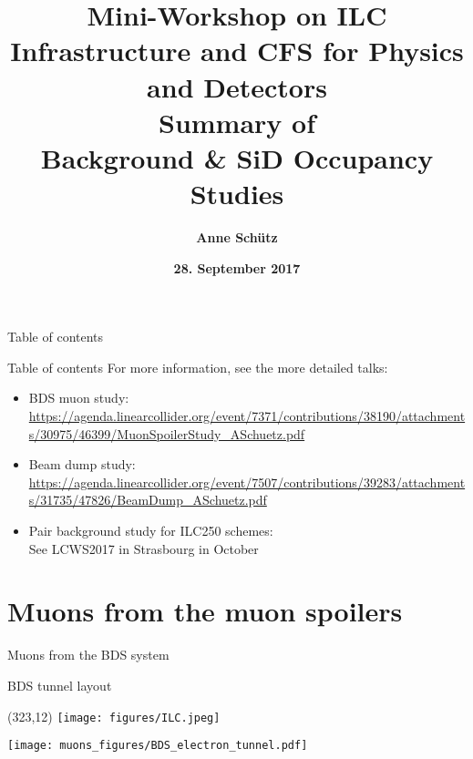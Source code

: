 \documentclass[xcolor={dvipsnames}]{beamer}
\title[ILC backgrounds \& SiD Occupancy]{\textbf{\alert{Mini-Workshop on ILC Infrastructure and CFS for Physics and Detectors} \\ \vspace*{0.3cm} \LARGE  Summary of \\Background \& SiD Occupancy Studies}}
\author{\textbf{Anne Sch\"utz}}
\institute{\textbf{DESY}}
\date{\textbf{28. September 2017}}
\newcommand{\ilclogo}{
  \setlength{\TPHorizModule}{1pt}
  \setlength{\TPVertModule}{1pt}
  \begin{textblock}{1}(323,12)
   \texttt{[image: figures/ILC.jpeg]}
  \end{textblock}
}
\begin{document}
{
\begin{frame}
  \titlepage
\end{frame}
}
\setcounter{tocdepth}{2}
\begin{frame}{Table of contents}
  \tableofcontents
\end{frame}
\begin{frame}{Table of contents}
  For more information, see the more detailed talks:
  \begin{itemize}
   \item \alert{BDS muon study}:\\
   {\small
   \url{https://agenda.linearcollider.org/event/7371/contributions/38190/attachments/30975/46399/MuonSpoilerStudy_ASchuetz.pdf}
   }
   \item \alert{Beam dump study}:\\
   {\small
   \url{https://agenda.linearcollider.org/event/7507/contributions/39283/attachments/31735/47826/BeamDump_ASchuetz.pdf}
   }
   \item \alert{Pair background study for ILC250 schemes}:\\
   {\small
   See LCWS2017 in Strasbourg in October
   }
  \end{itemize}
\end{frame}


\section{Muons from the muon spoilers}
\begin{frame}
 \begin{center}
  {\LARGE Muons from the BDS system}
 \end{center}
\end{frame}

\begin{frame}{BDS tunnel layout}
\ilclogo
\begin{center}
\texttt{[image: muons\_figures/BDS\_electron\_tunnel.pdf]}
\end{center}
\end{frame}
\end{document}
